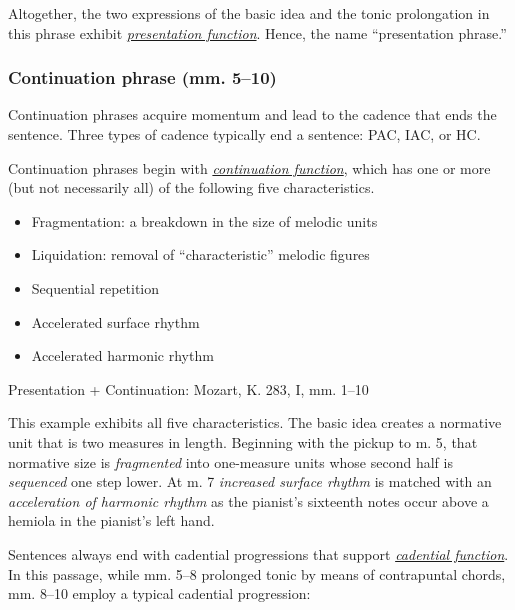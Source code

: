 \documentclass{book}
\providecommand{\tightlist}{%
  \setlength{\itemsep}{0pt}\setlength{\parskip}{0pt}}
\begin{document}
Altogether, the two expressions of the basic idea and the tonic prolongation
in this phrase exhibit
\href{themeFunctions.html\#presentation}{\emph{presentation function}}. Hence,
the name ``presentation phrase.''

\hypertarget{continuation-phrase-mm.-510}{%
\subsubsection{Continuation phrase (mm.
5--10)}\label{continuation-phrase-mm.-510}}

Continuation phrases acquire momentum and lead to the cadence that ends the
sentence. Three types of cadence typically end a sentence: PAC, IAC, or HC.

Continuation phrases begin with
\href{themeFunctions.html\#continuation-function}{\emph{continuation
function}}, which has one or more (but not necessarily all) of the following
five characteristics.

\begin{itemize}
\tightlist
\item
  Fragmentation: a breakdown in the size of melodic units\\
\item
  Liquidation: removal of ``characteristic'' melodic figures\\
\item
  Sequential repetition
\item
  Accelerated surface rhythm\\
\item
  Accelerated harmonic rhythm
\end{itemize}

Presentation + Continuation: Mozart, K. 283, I, mm. 1--10

This example exhibits all five characteristics. The basic idea creates a
normative unit that is two measures in length. Beginning with the pickup to m.
5, that normative size is \emph{fragmented} into one-measure units whose
second half is \emph{sequenced} one step lower. At m. 7 \emph{increased
surface rhythm} is matched with an \emph{acceleration of harmonic rhythm} as
the pianist's sixteenth notes occur above a hemiola in the pianist's left
hand.

Sentences always end with cadential progressions that support
\href{themeFunctions.html\#cadential-function}{\emph{cadential function}}. In
this passage, while mm. 5--8 prolonged tonic by means of contrapuntal chords,
mm. 8--10 employ a typical cadential progression:
\end{document}
